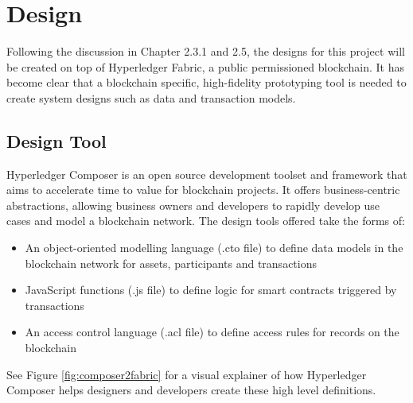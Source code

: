 \chapter{Design}
\graphicspath{{Chapter5/Figs/Raster/}{Chapter5/Figs/Tex/}{Chapter5/Figs/}}

Following the discussion in Chapter 2.3.1 and 2.5, the designs for this project 
will be created on top of Hyperledger Fabric, a public permissioned blockchain.
It has become clear that a blockchain specific, high-fidelity prototyping tool is needed 
to create system designs such as data and transaction models.

\section{Design Tool}

Hyperledger Composer is an open source development toolset and framework that aims to 
accelerate time to value for blockchain projects. It offers business-centric 
abstractions, allowing business owners and developers to rapidly develop 
use cases and model a blockchain network. The design tools offered take the forms of:
\begin{itemize}
    \setlength\itemsep{0em}            
    \item An object-oriented modelling language (.cto file) to define data models in 
    the blockchain network for assets, participants and transactions
    \item JavaScript functions (.js file) to define logic for smart contracts triggered by transactions
    \item An access control language (.acl file) to define access rules for records on the blockchain\\
    \citep{official2018composer}
\end{itemize}

See Figure \ref{fig:composer2fabric} for a visual explainer of how Hyperledger Composer 
helps designers and developers create these high level definitions.

